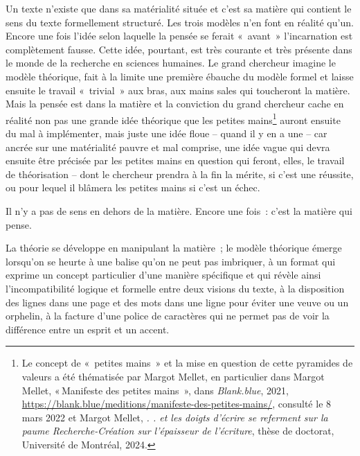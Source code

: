 Un texte n'existe que dans sa matérialité située et c'est sa matière qui
contient le sens du texte formellement structuré. Les trois modèles n'en
font en réalité qu'un. Encore une fois l'idée selon laquelle la pensée
se ferait «~avant~» l'incarnation est complètement fausse. Cette idée,
pourtant, est très courante et très présente dans le monde de la
recherche en sciences humaines. Le grand chercheur imagine le modèle
théorique, fait à la limite une première ébauche du modèle formel et
laisse ensuite le travail «~trivial~» aux bras, aux mains sales qui
toucheront la matière. Mais la pensée est dans la matière et la
conviction du grand chercheur cache en réalité non pas une grande idée
théorique que les petites mains\footnote{Le concept de «~petites mains~»
  et la mise en question de cette pyramides de valeurs a été thématisée
  par Margot Mellet, en particulier dans Margot Mellet, {«\,Manifeste
  des petites mains {\textbar}\,»}, dans \emph{Blank.blue}, 2021,
  \url{https://blank.blue/meditions/manifeste-des-petites-mains/},
  consulté le 8 mars 2022 et Margot Mellet, \emph{. . et les doigts
  d'écrire se referment sur la paume {Recherche}-{Création} sur
  l'épaisseur de l'écriture}, thèse de doctorat, Université de Montréal,
  2024.} auront ensuite du mal à implémenter, mais juste une idée floue
-- quand il y en a une -- car ancrée sur une matérialité pauvre et mal
comprise, une idée vague qui devra ensuite être précisée par les petites
mains en question qui feront, elles, le travail de théorisation -- dont
le chercheur prendra à la fin la mérite, si c'est une réussite, ou pour
lequel il blâmera les petites mains si c'est un échec.

Il n'y a pas de sens en dehors de la matière. Encore une fois~: c'est la
matière qui pense.

La théorie se développe en manipulant la matière~; le modèle théorique
émerge lorsqu'on se heurte à une balise qu'on ne peut pas imbriquer, à
un format qui exprime un concept particulier d'une manière spécifique et
qui révèle ainsi l'incompatibilité logique et formelle entre deux
visions du texte, à la disposition des lignes dans une page et des mots
dans une ligne pour éviter une veuve ou un orphelin, à la facture d'une
police de caractères qui ne permet pas de voir la différence entre un
esprit et un accent.

